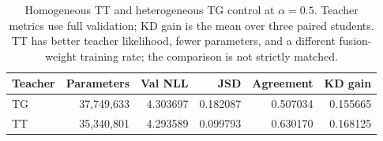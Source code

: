 \begin{table}[htbp]
\centering\small
\begin{tabular}{lrrrrr}
\toprule
Teacher & Parameters & Val NLL & JSD & Agreement & KD gain \\
\midrule
TG & 37,749,633 & 4.303697 & 0.182087 & 0.507034 & 0.155665 \\
TT & 35,340,801 & 4.293589 & 0.099793 & 0.630170 & 0.168125 \\
\bottomrule
\end{tabular}
\caption{Homogeneous TT and heterogeneous TG control at $\alpha=0.5$. Teacher metrics use full validation; KD gain is the mean over three paired students. TT has better teacher likelihood, fewer parameters, and a different fusion-weight training rate; the comparison is not strictly matched.}
\label{tab:tt_vs_tg}
\end{table}
